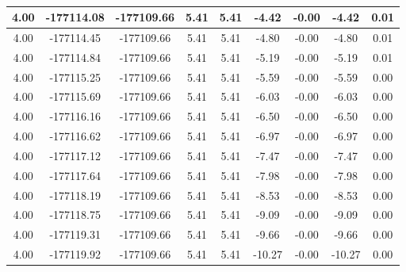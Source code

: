 \begin{table}[htbp]
\begin{adjustbox}{angle=90}
\begin{tabular}{|c|c|c|c|c|c|c|c|c|}
 4.00 & -177114.08 & -177109.66 & 5.41 & 5.41 & -4.42 & -0.00 & -4.42 & 0.01\\ \hline
 4.00 & -177114.45 & -177109.66 & 5.41 & 5.41 & -4.80 & -0.00 & -4.80 & 0.01\\ \hline
 4.00 & -177114.84 & -177109.66 & 5.41 & 5.41 & -5.19 & -0.00 & -5.19 & 0.01\\ \hline
 4.00 & -177115.25 & -177109.66 & 5.41 & 5.41 & -5.59 & -0.00 & -5.59 & 0.00\\ \hline
 4.00 & -177115.69 & -177109.66 & 5.41 & 5.41 & -6.03 & -0.00 & -6.03 & 0.00\\ \hline
 4.00 & -177116.16 & -177109.66 & 5.41 & 5.41 & -6.50 & -0.00 & -6.50 & 0.00\\ \hline
 4.00 & -177116.62 & -177109.66 & 5.41 & 5.41 & -6.97 & -0.00 & -6.97 & 0.00\\ \hline
 4.00 & -177117.12 & -177109.66 & 5.41 & 5.41 & -7.47 & -0.00 & -7.47 & 0.00\\ \hline
 4.00 & -177117.64 & -177109.66 & 5.41 & 5.41 & -7.98 & -0.00 & -7.98 & 0.00\\ \hline
 4.00 & -177118.19 & -177109.66 & 5.41 & 5.41 & -8.53 & -0.00 & -8.53 & 0.00\\ \hline
 4.00 & -177118.75 & -177109.66 & 5.41 & 5.41 & -9.09 & -0.00 & -9.09 & 0.00\\ \hline
 4.00 & -177119.31 & -177109.66 & 5.41 & 5.41 & -9.66 & -0.00 & -9.66 & 0.00\\ \hline
 4.00 & -177119.92 & -177109.66 & 5.41 & 5.41 & -10.27 & -0.00 & -10.27 & 0.00\\ \hline
            \end{tabular}
        \end{adjustbox}
        \caption{}
        \label{}
    \end{table}
    